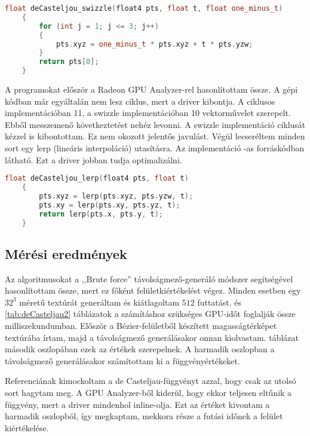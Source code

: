 \begin{lstlisting}[caption={de Casteljau swizzle operátorokkal}, language={C++}, label={lst:swizzle}]
	float deCasteljou_swizzle(float4 pts, float t, float one_minus_t)
	{
		for (int j = 1; j <= 3; j++)
		{
			pts.xyz = one_minus_t * pts.xyz + t * pts.yzw;
		}
		return pts[0];
	}
\end{lstlisting}

A programokat először a Radeon GPU Analyzer-rel hasonlítottam össze. A gépi kódban már egyáltalán nem lesz ciklus, mert a driver kibontja. A ciklusos implementációban 11, a swizzle implementációban 10 vektorművelet szerepelt. Ebből messzemenő következtetést nehéz levonni. A swizzle implementáció ciklusát kézzel is kibontottam. Ez nem okozott jelentős javulást. Végül lecseréltem minden sort egy lerp (lineáris interpoláció) utasításra. Az implementáció -as forráskódban látható. Ezt a driver jobban tudja optimalizálni. 

\lstset{}
\begin{lstlisting}[caption={de Casteljau lerp függvénnyel}, language={C++}, label={lst:lerp}]
	float deCasteljou_lerp(float4 pts, float t)
	{
		pts.xyz = lerp(pts.xyz, pts.yzw, t);
		pts.xy = lerp(pts.xy, pts.yz, t);
		return lerp(pts.x, pts.y, t);
	}
\end{lstlisting}


\subsection{Mérési eredmények}
Az algoritmusokat a ,,Brute force'' távolságmező-generáló módszer segítségével hasonlítottam össze, mert ez főként felületkiértékelést végez. Minden esetben egy $32^3$ méretű textúrát generáltam és kiátlagoltam $512$ futtatást.  és \ref{tab:deCasteljau2} táblázatok a számításhoz szükséges GPU-időt foglalják össze milliszekundumban. Először a Bézier-felületből készített magasságtérképet textúrába írtam, majd a távolságmező generálásakor onnan kiolvastam.  táblázat második oszlopában ezek az értékek szerepelnek. A harmadik oszlopban a távolságmező generálásakor számítottam ki a függvényértékeket.

Referenciának kimockoltam a de Casteljau-függvényt azzal, hogy csak az utolsó sort hagytam meg. A GPU Analyzer-ből kiderül, hogy ekkor teljesen eltűnik a függvény, mert a driver mindenhol inline-olja. Ezt az értéket kivontam a harmadik oszlopból, így megkaptam, mekkora része a futási időnek a felület kiértékelése.

